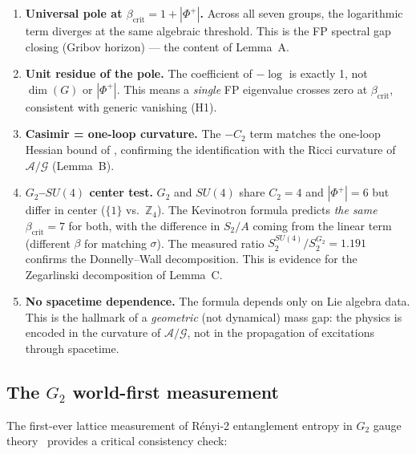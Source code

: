 \documentclass[11pt,a4paper]{amsart}
\theoremstyle{definition}
\theoremstyle{remark}
\newcommand{\Z}{\mathbb{Z}}
\newcommand{\calA}{\mathcal{A}}
\newcommand{\calG}{\mathcal{G}}
\newcommand{\PhiPlus}{\Phi^+}
\newcommand{\betacrit}{\beta_{\mathrm{crit}}}
\begin{document}
\begin{enumerate}[label=\textbf{Obs.~\arabic*}:]
\item \textbf{Universal pole at $\betacrit = 1 + |\PhiPlus|$.}
      Across all seven groups, the logarithmic term diverges at the same
      algebraic threshold. This is the FP spectral gap closing
      (Gribov horizon) --- the content of Lemma~A.

\item \textbf{Unit residue of the pole.}
      The coefficient of $-\log$ is exactly 1, not $\dim(G)$ or $|\PhiPlus|$.
      This means a \emph{single} FP eigenvalue crosses zero at $\betacrit$,
      consistent with generic vanishing (H1).

\item \textbf{Casimir = one-loop curvature.}
      The $-C_2$ term matches the one-loop Hessian bound of
      \cite{RemondiereFPHess}, confirming the identification with the Ricci
      curvature of $\calA/\calG$ (Lemma~B).

\item \textbf{$G_2$--$SU(4)$ center test.}
      $G_2$ and $SU(4)$ share $C_2 = 4$ and $|\PhiPlus| = 6$ but differ
      in center ($\{1\}$ vs.\ $\Z_4$). The Kevinotron formula predicts
      \emph{the same} $\betacrit = 7$ for both, with the difference in
      $S_2/A$ coming from the linear term (different $\beta$ for matching
      $\sigma$). The measured ratio $S_2^{SU(4)}/S_2^{G_2} = 1.191$
      confirms the Donnelly--Wall decomposition. This is evidence for the
      Zegarlinski decomposition of Lemma~C.

\item \textbf{No spacetime dependence.}
      The formula depends only on Lie algebra data. This is the hallmark
      of a \emph{geometric} (not dynamical) mass gap: the physics is
      encoded in the curvature of $\calA/\calG$, not in the propagation
      of excitations through spacetime.
\end{enumerate}

\subsection{The $G_2$ world-first measurement}

The first-ever lattice measurement of R\'enyi-2 entanglement entropy in $G_2$
gauge theory~\cite{Remondiere2026G2} provides a critical consistency check:
\end{document}
